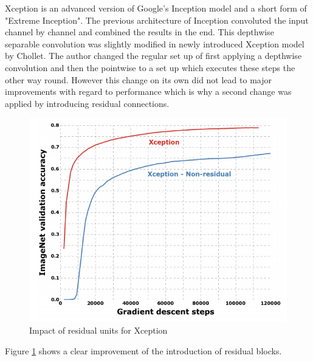 Xception is an advanced version of Google's Inception model and a short form of "Extreme Inception". The previous architecture of Inception convoluted the input channel by channel and combined the results in the end. This depthwise separable convolution was slightly modified in newly introduced Xception model by Chollet\cite{chollet2017xception}. The author changed the regular set up of first applying a depthwise convolution and then the pointwise to a set up which executes these steps the other way round. However this change on its own did not lead to major improvements with regard to performance which is why a second change was applied by introducing residual connections\cite{chollet2017xception}.
\begin{figure}
  \centering
  \includegraphics[width=\linewidth]{figures/xception_residuals.png}
  \caption{Impact of residual units for Xception}
  \label{xception_residuals}
\end{figure}

Figure \ref{xception_residuals} shows a clear improvement of the introduction of residual blocks.

